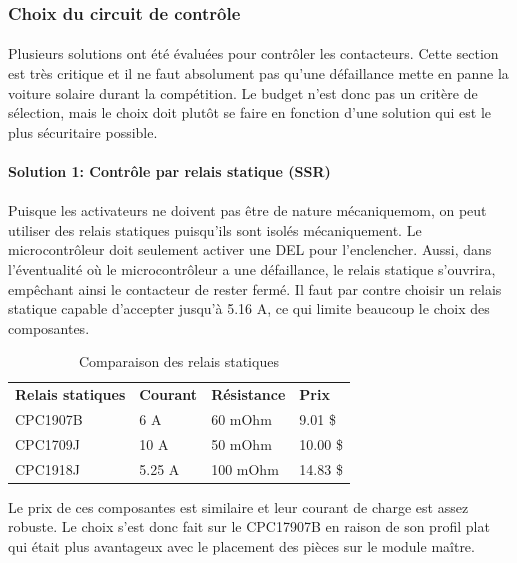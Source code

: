 	\subsubsection*{Choix du circuit de contrôle}
		\paragraph*{}
		Plusieurs solutions ont été évaluées pour contrôler les contacteurs. Cette section est très critique et il ne faut absolument pas qu'une défaillance mette en panne la voiture solaire durant la compétition. Le budget n'est donc pas un critère de sélection, mais le choix doit plutôt se faire en fonction d'une solution qui est le plus sécuritaire possible.

		\paragraph*{Solution 1: Contrôle par relais statique (SSR)}
		\paragraph*{}
		Puisque les activateurs ne doivent pas être de nature mécaniquemom, on peut utiliser des relais statiques puisqu'ils sont isolés mécaniquement. Le microcontrôleur doit seulement activer une DEL pour l'enclencher. Aussi, dans l'éventualité où le microcontrôleur a une défaillance, le relais statique s'ouvrira, empêchant ainsi le contacteur de rester fermé. Il faut par contre choisir un relais statique capable d'accepter jusqu'à 5.16 A, ce qui limite beaucoup le choix des composantes.

		\begin{table}[H]
			\centering
			\caption{Comparaison des relais statiques}
			\label{ComparaisonOpto}
			\renewcommand{\arraystretch}{1.3}
			\begin{tabular}{|p{3cm}|p{3cm}|p{3cm}|p{3cm}|}
				\hline
				\textbf{Relais statiques} & \textbf{Courant} & \textbf{Résistance} & \textbf{Prix}
				\\ \hhline{|=|=|=|=|}
				CPC1907B & 6 A & 60 mOhm & 9.01 \$ \\ \hline
				CPC1709J & 10 A & 50 mOhm & 10.00 \$ \\ \hline
				CPC1918J & 5.25 A &	100 mOhm & 14.83 \$	\\ \hline
			\end{tabular}
		\end{table}

		Le prix de ces composantes est similaire et leur courant de charge est assez robuste. Le choix s'est donc fait sur le CPC17907B en raison de son profil plat qui était plus avantageux avec le placement des pièces sur le module maître.

